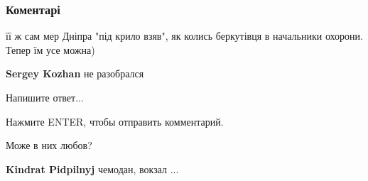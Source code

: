 
 
 
 
 
\subsubsection{Коментарі}
\label{sec:09_09_2021.fb.melnichuk_sergej.1.foto_maguchih_lasickene.cmt}

\begin{itemize} %
 
її ж сам мер Дніпра "під крило взяв", як колись беркутівця в начальники охорони. Тепер їм усе можна)

 
\textbf{Sergey Kozhan} не разобрался

Напишите ответ...

Нажмите ENTER, чтобы отправить комментарий.
 
Може в них любов?

 
\textbf{Kindrat Pidpilnyj} чемодан, вокзал ...


 

\end{itemize}
